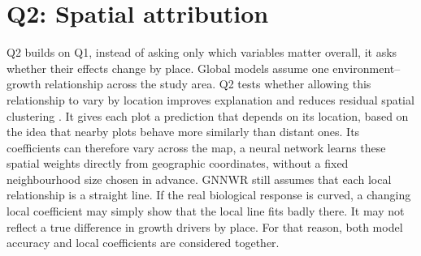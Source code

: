 \documentclass[logo,msc,ai]{infthesis}           %
\begin{document}
\section{Q2: Spatial attribution}
Q2 builds on Q1, instead of asking only which variables matter overall, it asks whether their effects change by place. Global models assume one environment--growth relationship across the study area. Q2 tests whether allowing this relationship to vary by location improves explanation and reduces residual spatial clustering \cite{du2020Geographically_C6_GWR}. It gives each plot a prediction that depends on its location, based on the idea that nearby plots behave more similarly than distant ones. Its coefficients can therefore vary across the map, a neural network learns these spatial weights directly from geographic coordinates, without a fixed neighbourhood size chosen in advance. GNNWR still assumes that each local relationship is a straight line. If the real biological response is curved, a changing local coefficient may simply show that the local line fits badly there. It may not reflect a true difference in growth drivers by place. For that reason, both model accuracy and local coefficients are considered together.
\end{document}
